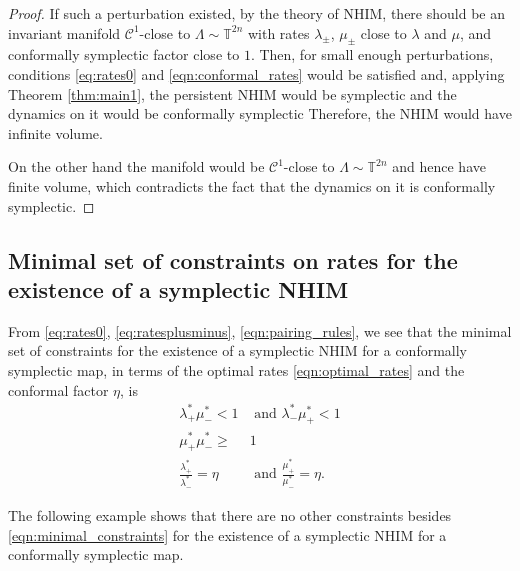 \documentclass[11pt]{amsart}
\theoremstyle{definition}
\theoremstyle{remark}
\numberwithin{equation}{section}
\newcommand{\C}{\mathcal{C}}
\def\torus{{\mathbb T}}
\begin{document}
\begin{proof}
If such a perturbation existed, by the theory of NHIM, there
should be an invariant manifold $\C^1$-close to $\Lambda\sim\torus^{2n} $ with rates $\lambda_\pm$, $\mu_\pm$ close to $\lambda$ and $\mu$, and conformally symplectic factor close to $1$.
Then, for small enough perturbations, conditions \eqref{eq:rates0} and  \eqref{eqn:conformal_rates} would be satisfied and, applying  Theorem \ref{thm:main1}, the persistent  NHIM would be
symplectic and the dynamics on  it would be conformally symplectic
Therefore, the NHIM would have infinite volume.

On the other hand the manifold would be $\C^1$-close to
$\Lambda\sim\torus^{2n} $ and hence have finite volume, which
contradicts the fact that the dynamics on it is conformally
symplectic.
%
%
%
\end{proof}



\subsection{Minimal set of constraints  on rates for the existence of a symplectic NHIM}

From \eqref{eq:rates0}, \eqref{eq:ratesplusminus}, \eqref{eqn:pairing_rules}, we see that the minimal set of constraints  for the existence of a  symplectic  NHIM for a conformally symplectic map, in terms of the optimal rates  \eqref{eqn:optimal_rates} and the conformal factor $\eta$, is
\begin{equation}\label{eqn:minimal_constraints}
\begin{split}
 \lambda_+^*\mu_-^*< 1 &\textrm{ and } \lambda_-^*\mu_+^*<1 \\
 \mu_+^*\mu_-^*\ge& 1\\
 \frac{\lambda_+^*}{\lambda_-^*}=\eta &\textrm { and } \frac{\mu_+^*}{\mu_-^*}=\eta .
 \end{split}
\end{equation}

The following example shows that  there are no other constraints besides \eqref{eqn:minimal_constraints} for the existence of a symplectic NHIM for a conformally symplectic map.
\end{document}
